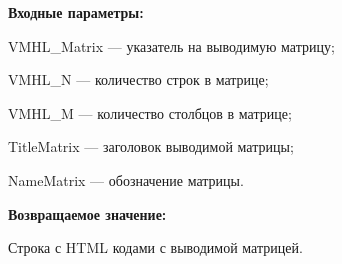 \textbf{Входные параметры:}
 
    VMHL\_Matrix --- указатель на выводимую матрицу;
 
    VMHL\_N --- количество строк в матрице;
 
    VMHL\_M --- количество столбцов в матрице;
 
    TitleMatrix --- заголовок выводимой матрицы;
 
    NameMatrix --- обозначение матрицы.

\textbf{Возвращаемое значение:}

Строка с HTML кодами с выводимой матрицей.